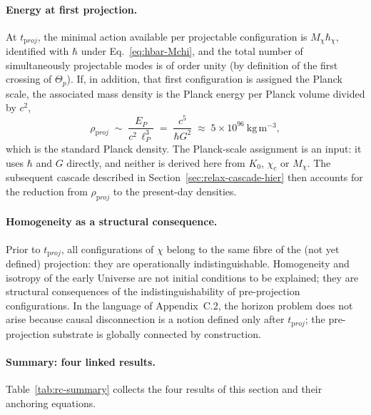     \paragraph{Energy at first projection.}
      At $t_{\mathrm proj}$, the minimal action available per projectable
      configuration is $M_\chi\hbar_\chi$, identified with $\hbar$ under Eq.~\eqref{eq:hbar-Mchi}, and the total
      number of simultaneously projectable modes is of order unity (by definition of the first crossing of $\Theta_p$).
      If, in addition, that first configuration is assigned the Planck scale, the associated mass density is the
      Planck energy per Planck volume divided by $c^2$,
    \begin{equation}
      \label{eq:rc-rho-planck}
      \rho_{\mathrm proj}
      \;\sim\; \frac{E_P}{c^2\,\ell_P^3}
      \;=\; \frac{c^5}{\hbar G^2}
      \;\approx\; 5 \times 10^{96}~\mathrm{kg\,m^{-3}},
      \end{equation}
      which is the standard Planck density.
      The Planck-scale assignment is an input: it uses $\hbar$ and $G$ directly, and neither is derived here from
      $K_0$, $\chi_c$ or $M_\chi$.
      The subsequent cascade described in Section~\ref{sec:relax-cascade-hier}
      then accounts for the reduction from $\rho_{\mathrm proj}$ to the present-day densities.

    \paragraph{Homogeneity as a structural consequence.}
      Prior to $t_{\mathrm proj}$, all configurations of $\chi$ belong to the
      same fibre of the (not yet defined) projection: they are operationally indistinguishable.
      Homogeneity and isotropy of the early Universe are not initial
      conditions to be explained; they are structural consequences of the
      indistinguishability of pre-projection configurations.
      In the language of Appendix~C.2, the horizon problem does not arise
      because causal disconnection is a notion defined only after
      $t_{\mathrm proj}$; the pre-projection substrate is globally connected by construction.

    \paragraph{Summary: four linked results.}
      Table~\ref{tab:rc-summary} collects the four results of this section
      and their anchoring equations.

